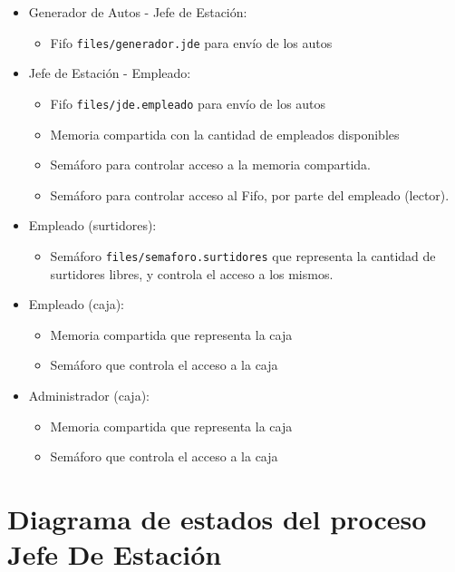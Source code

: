 \documentclass[12pt,a4paper,spanish]{article}
\begin{document}
	\begin{itemize}
	
	\item Generador de Autos - Jefe de Estación:
		\begin{itemize}
			\item Fifo \texttt{files/generador.jde} para envío de los autos
		\end{itemize}
	
	\item Jefe de Estación - Empleado:
	\begin{itemize}
		\item Fifo \texttt{files/jde.empleado} para envío de los autos
		\item Memoria compartida con la cantidad de empleados disponibles
		\item Semáforo para controlar acceso a la memoria compartida.
		\item Semáforo para controlar acceso al Fifo, por parte del empleado (lector).
	\end{itemize}

	\item Empleado (surtidores):
	\begin{itemize}
		\item Semáforo \texttt{files/semaforo.surtidores} que representa la 
		cantidad de surtidores libres, y controla el acceso a los mismos.
	\end{itemize}

	\item Empleado (caja):
	\begin{itemize}
		\item Memoria compartida que representa la caja
		\item Semáforo que controla el acceso a la caja
	\end{itemize}

	\item Administrador (caja):
	\begin{itemize}
		\item Memoria compartida que representa la caja
		\item Semáforo que controla el acceso a la caja
	\end{itemize}

	\end{itemize}
	\newpage
	\section{Diagrama de estados del proceso Jefe De Estación}
\end{document}
